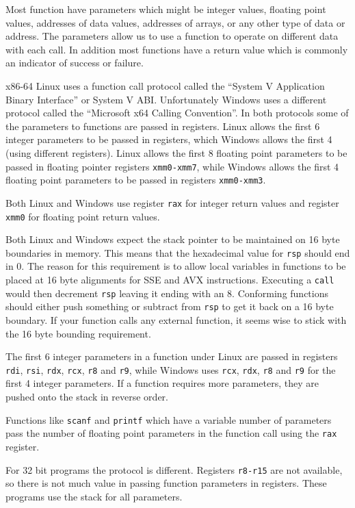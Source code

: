 \documentclass[11pt,b5paper]{book}
\begin{document}
Most function have parameters which might be integer values, floating point values,  
addresses of data values, addresses of arrays, or any other type of data or address.
The parameters allow us to use a function to operate on different data with each
call.
In addition most functions have a return value which is commonly an indicator of success or failure.

x86-64 Linux uses a function call protocol called the ``System V Application Binary Interface'' or System V ABI.
Unfortunately Windows uses a different protocol called the ``Microsoft x64 Calling Convention''.
In both protocols some of the parameters to functions are passed in registers.
Linux allows the first 6 integer parameters to be passed in registers, which Windows allows the first 4 (using
different registers).
Linux allows the first 8 floating point parameters to be passed in floating pointer registers {\tt xmm0-xmm7},
while Windows allows the first 4 floating point parameters to be passed in registers {\tt xmm0-xmm3}.

Both Linux and Windows use register {\tt rax} for integer return values and register {\tt xmm0} for
floating point return values.

Both Linux and Windows expect the stack pointer to be maintained on 16 byte boundaries in memory.
This means that the hexadecimal value for {\tt rsp} should end in 0.
The reason for this requirement is to allow local variables in functions to
be placed at 16 byte alignments for SSE and AVX instructions.
Executing a {\tt call} would then decrement {\tt rsp} leaving it ending with an 8.
Conforming functions should either push something or subtract from {\tt rsp} to get it back
on a 16 byte boundary.
If your function calls any external function, it seems wise to stick with the 16 byte bounding requirement.

The first 6 integer parameters in a function under Linux are passed in registers
{\tt rdi}, {\tt rsi}, {\tt rdx}, {\tt rcx}, {\tt r8} and {\tt r9}, while Windows uses {\tt rcx}, {\tt rdx},
{\tt r8} and {\tt r9} for the first 4 integer parameters.
If a function requires more parameters, they are pushed onto the stack in reverse order.

Functions like {\tt scanf} and {\tt printf} which have a variable number of parameters pass the number of floating point parameters in the function call using the {\tt rax} register.

For 32 bit programs the protocol is different.
Registers {\tt r8-r15} are not available, so there is not much value in passing function parameters in
registers.
These programs use the stack for all parameters.
\end{document}
